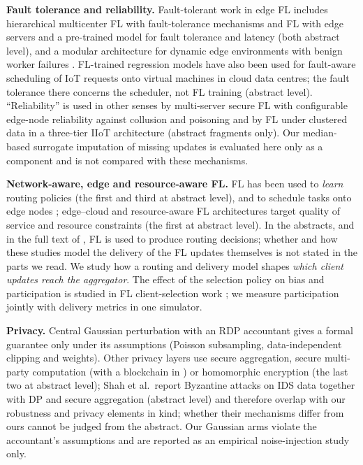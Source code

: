 \textbf{Fault tolerance and reliability.} Fault-tolerant work in edge FL includes hierarchical multicenter FL with fault-tolerance mechanisms \cite{chen2025hierarchical} and FL with edge servers and a pre-trained model for fault tolerance and latency \cite{haripriya2025fault} (both abstract level), and a modular architecture for dynamic edge environments with benign worker failures \cite{almeida2025modular}. FL-trained regression models have also been used for fault-aware scheduling of IoT requests onto virtual machines in cloud data centres; the fault tolerance there concerns the scheduler, not FL training \cite{aburukba2025scheduling} (abstract level). ``Reliability'' is used in other senses by multi-server secure FL with configurable edge-node reliability against collusion and poisoning \cite{liu2026reliability} and by FL under clustered data in a three-tier IIoT architecture \cite{tang2026fedcst} (abstract fragments only). Our median-based surrogate imputation of missing updates is evaluated here only as a component and is not compared with these mechanisms.

\textbf{Network-aware, edge and resource-aware FL.} FL has been used to \emph{learn} routing policies \cite{abdallah2026routing,zhang2026adaptive,bhardwaj2024routing} (the first and third at abstract level), and to schedule tasks onto edge nodes \cite{alanazi2026edgeguard}; edge--cloud and resource-aware FL architectures target quality of service and resource constraints \cite{zhou2024qos,liu2024iiot,mughal2024adaptive} (the first at abstract level). In the abstracts, and in the full text of \cite{zhang2026adaptive}, FL is used to produce routing decisions; whether and how these studies model the delivery of the FL updates themselves is not stated in the parts we read. We study how a routing and delivery model shapes \emph{which client updates reach the aggregator}. The effect of the selection policy on bias and participation is studied in FL client-selection work \cite{cho2022biased}; we measure participation jointly with delivery metrics in one simulator.

\textbf{Privacy.} Central Gaussian perturbation with an RDP accountant \cite{abadi2016dpsgd,mcmahan2018dprnn,mironov2017renyi,zhu2019poisson} gives a formal guarantee only under its assumptions (Poisson subsampling, data-independent clipping and weights). Other privacy layers use secure aggregation, secure multi-party computation (with a blockchain in \cite{geng2024smpc}) or homomorphic encryption \cite{bonawitz2017secagg,geng2024smpc,lan2025ckks} (the last two at abstract level); Shah et al.\ report Byzantine attacks on IDS data together with DP and secure aggregation \cite{shah2026trisafe} (abstract level) and therefore overlap with our robustness and privacy elements in kind; whether their mechanisms differ from ours cannot be judged from the abstract. Our Gaussian arms violate the accountant's assumptions and are reported as an empirical noise-injection study only.

